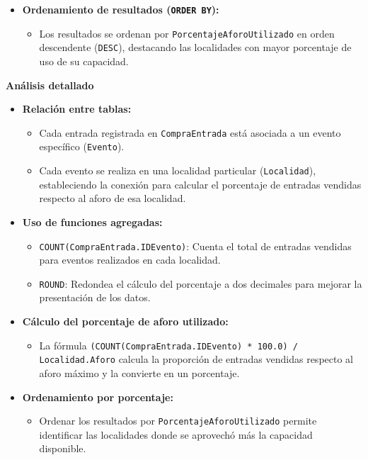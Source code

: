 \begin{itemize}
	\item \textbf{Ordenamiento de resultados (\texttt{ORDER BY}):} \begin{itemize} \item Los resultados se ordenan por \texttt{PorcentajeAforoUtilizado} en orden descendente (\texttt{DESC}), destacando las localidades con mayor porcentaje de uso de su capacidad. \end{itemize} \end{itemize}

\textbf{Análisis detallado}

\begin{itemize} \item \textbf{Relación entre tablas:} \begin{itemize} \item Cada entrada registrada en \texttt{CompraEntrada} está asociada a un evento específico (\texttt{Evento}). \item Cada evento se realiza en una localidad particular (\texttt{Localidad}), estableciendo la conexión para calcular el porcentaje de entradas vendidas respecto al aforo de esa localidad. \end{itemize}
	
	\item \textbf{Uso de funciones agregadas:} \begin{itemize} \item \texttt{COUNT(CompraEntrada.IDEvento)}: Cuenta el total de entradas vendidas para eventos realizados en cada localidad. \item \texttt{ROUND}: Redondea el cálculo del porcentaje a dos decimales para mejorar la presentación de los datos. \end{itemize}
	
	\item \textbf{Cálculo del porcentaje de aforo utilizado:} \begin{itemize} \item La fórmula \texttt{(COUNT(CompraEntrada.IDEvento) * 100.0) / Localidad.Aforo} calcula la proporción de entradas vendidas respecto al aforo máximo y la convierte en un porcentaje. \end{itemize}
	
	\item \textbf{Ordenamiento por porcentaje:} \begin{itemize} \item Ordenar los resultados por \texttt{PorcentajeAforoUtilizado} permite identificar las localidades donde se aprovechó más la capacidad disponible. \end{itemize} \end{itemize}

